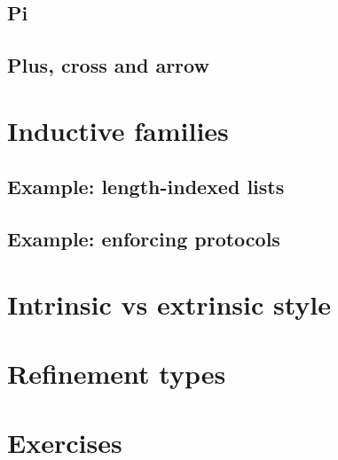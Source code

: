 \documentclass{beamer}
\begin{document}
\subsection{Pi}

\subsection{Plus, cross and arrow}


\section{Inductive families}

\subsection{Example: length-indexed lists}

\subsection{Example: enforcing protocols}

\section{Intrinsic vs extrinsic style}

\section{Refinement types}

\section{Exercises}
\end{document}
